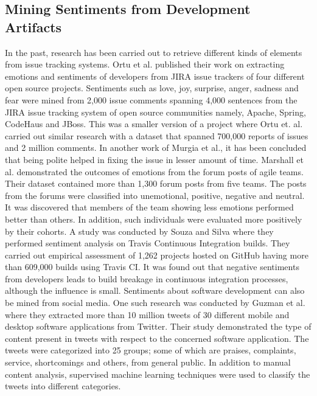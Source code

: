 \documentclass[a4paper,12pt,twoside]{report}
\begin{document}
\subsection{Mining Sentiments from Development Artifacts}
In the past, research has been carried out to retrieve different kinds of elements from issue tracking systems. Ortu et al.\cite{Ortu2017} published their work on extracting emotions and sentiments of developers from JIRA issue trackers of four different open source projects.  Sentiments such as love, joy, surprise, anger, sadness and fear were mined from 2,000 issue comments spanning 4,000 sentences from the JIRA issue tracking system of open source communities namely, Apache, Spring, CodeHaus and JBoss. This was a smaller version of a project where Ortu et. al.\cite{Ortu2015} carried out similar research with a dataset that spanned 700,000 reports of issues and 2 million comments. In another work of Murgia et al.\cite{Murgia2014}, it has been concluded that being polite helped in fixing the issue in lesser amount of time. 
\bigbreak
Marshall et al.\cite{Marshall2016} demonstrated the outcomes of emotions from the forum posts of agile teams. Their dataset contained more than 1,300 forum posts from five teams. The posts from the forums were classified into unemotional, positive, negative and neutral. It was discovered that members of the team showing less emotions performed better than others. In addition, such individuals were evaluated more positively by their cohorts. 
\bigbreak
A study was conducted by Souza and Silva \cite{Souza2017} where they performed sentiment analysis on Travis Continuous Integration builds. They carried out empirical assessment of 1,262 projects hosted on GitHub having more than 609,000 builds using Travis CI. It was found out that negative sentiments from developers leads to build breakage in continuous integration processes, although the influence is small. 
\bigbreak
Sentiments about software development can also be mined from social media. One such research was conducted by Guzman et al.\cite{Guzman2017} where they extracted more than 10 million tweets of 30 different mobile and desktop software applications from Twitter. Their study demonstrated the type of content present in tweets with respect to the concerned software application. The tweets were categorized into 25 groups; some of which are praises, complaints, service, shortcomings and others, from general public. In addition to manual content analysis, supervised machine learning techniques were used to classify the tweets into different categories. 
\end{document}
